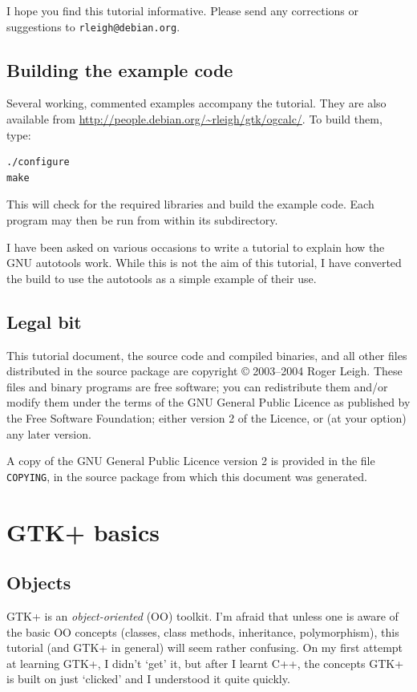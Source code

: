 \documentclass[a4paper,oneside]{article}
\newcommand{\filename}[1]{\texttt{#1}}
\begin{document}
I hope you find this tutorial informative.  Please send any
corrections or suggestions to \texttt{rleigh@debian.org}.

\subsection{Building the example code}

Several working, commented examples accompany the tutorial.  They are
also available from
\url{http://people.debian.org/~rleigh/gtk/ogcalc/}.  To build them,
type:

\begin{verbatim}
./configure
make
\end{verbatim}

\noindent This will check for the required libraries and build the
example code.  Each program may then be run from within its
subdirectory.

I have been asked on various occasions to write a tutorial to explain
how the GNU autotools work.  While this is not the aim of this
tutorial, I have converted the build to use the autotools as a simple
example of their use.

\subsection{Legal bit}

This tutorial document, the source code and compiled binaries, and all
other files distributed in the source package are copyright
\copyright{} 2003--2004 Roger Leigh.  These files and binary programs
are free software; you can redistribute them and/or modify them under
the terms of the GNU General Public Licence as published by the Free
Software Foundation; either version 2 of the Licence, or (at your
option) any later version.

A copy of the GNU General Public Licence version 2 is provided in the
file \filename{COPYING}, in the source package from which this
document was generated.


\section{GTK+ basics}

\subsection{Objects}

GTK+ is an \emph{object-oriented} (OO) toolkit.  I'm afraid that
unless one is aware of the basic OO concepts (classes, class methods,
inheritance, polymorphism), this tutorial (and GTK+ in general) will
seem rather confusing.  On my first attempt at learning GTK+, I didn't
`get' it, but after I learnt C++, the concepts GTK+ is built on just
`clicked' and I understood it quite quickly.
\end{document}

